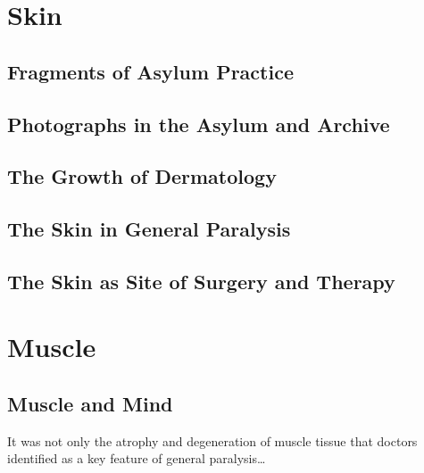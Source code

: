 \documentclass[
  openany]{book}
\begin{document}
\hypertarget{skin}{%
\chapter{Skin}\label{skin}}

\hypertarget{fragments-of-asylum-practice}{%
\section{Fragments of Asylum Practice}\label{fragments-of-asylum-practice}}

\hypertarget{photographs-in-the-asylum-and-archive}{%
\section{Photographs in the Asylum and Archive}\label{photographs-in-the-asylum-and-archive}}

\hypertarget{the-growth-of-dermatology}{%
\section{The Growth of Dermatology}\label{the-growth-of-dermatology}}

\hypertarget{the-skin-in-general-paralysis}{%
\section{The Skin in General Paralysis}\label{the-skin-in-general-paralysis}}

\hypertarget{the-skin-as-site-of-surgery-and-therapy}{%
\section{The Skin as Site of Surgery and Therapy}\label{the-skin-as-site-of-surgery-and-therapy}}

\hypertarget{muscle}{%
\chapter{Muscle}\label{muscle}}

\hypertarget{muscle-and-mind}{%
\section{Muscle and Mind}\label{muscle-and-mind}}

It was not only the atrophy and degeneration of muscle tissue that doctors identified as a key feature of general paralysis\ldots{}
\end{document}
